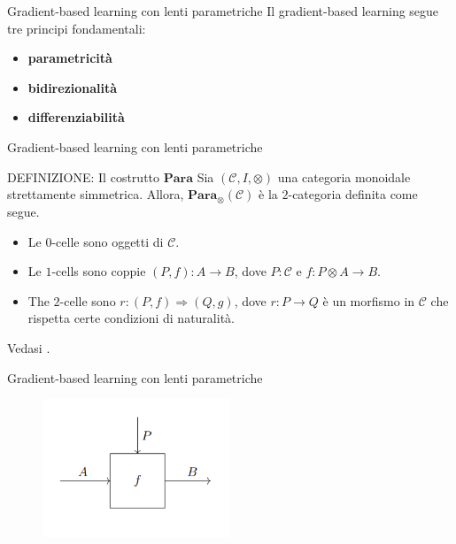 \documentclass{beamer}
\begin{document}
\begin{frame}{Gradient-based learning con lenti parametriche}
    Il gradient-based learning segue tre principi fondamentali:
    \begin{itemize}
        \item<1-> \textbf{parametricità}
        \item<2-> \textbf{bidirezionalità}
        \item<3-> \textbf{differenziabilità}
    \end{itemize}
\end{frame}

\begin{frame}{Gradient-based learning con lenti parametriche}
    \begin{block}{DEFINIZIONE: Il costrutto $\mathbf{Para}$}
        Sia $(\mathcal{C},I,\otimes)$ una categoria monoidale strettamente simmetrica. Allora, $\mathbf{Para}_{\otimes}(\mathcal{C})$ è la $2$-categoria definita come segue.
        \begin{itemize}
          \item Le $0$-celle sono oggetti di $\mathcal{C}$.
          \item Le $1$-cells sono coppie $(P,f): A \to B$, dove $P : \mathcal{C}$ e $f: P \otimes A \to B$.
          \item The $2$-celle sono $r: (P,f) \Rightarrow (Q,g)$, dove $r: P \to Q$ è un morfismo in $\mathcal{C}$ che rispetta certe condizioni di naturalità.
        \end{itemize}
        Vedasi \cite{gavranovic2024fundamental}.
      \end{block}
\end{frame}

\begin{frame}{Gradient-based learning con lenti parametriche}
    \begin{figure}
        \begin{center}
            \includegraphics[width=0.5\textwidth]{figures/para.png}
            \caption*{\cite{gavranovic2024fundamental}}
        \end{center}
    \end{figure}
\end{frame}
\end{document}
